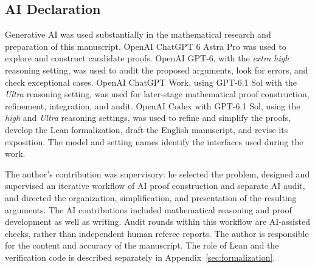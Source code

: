 \subsection*{AI Declaration}
Generative AI was used substantially in the mathematical research and
preparation of this manuscript. OpenAI ChatGPT 6 Astra Pro was used to
explore and construct candidate proofs. OpenAI GPT-6, with the
\emph{extra high} reasoning setting, was used to audit the proposed
arguments, look for errors, and check exceptional cases. OpenAI ChatGPT
Work, using GPT-6.1 Sol with the \emph{Ultra} reasoning setting, was
used for later-stage mathematical proof construction, refinement,
integration, and audit. OpenAI Codex
with GPT-6.1 Sol, using the \emph{high} and \emph{Ultra} reasoning
settings, was used to refine and simplify the proofs, develop the Lean
formalization, draft the English manuscript, and revise its exposition.
The model and setting names identify the interfaces used during the work.

The author's contribution was supervisory: he selected the problem,
designed and supervised an iterative workflow of AI proof construction
and separate AI audit, and directed the organization, simplification,
and presentation of the resulting arguments. The AI contributions
included mathematical reasoning and proof development as well as
writing. Audit rounds within this workflow are AI-assisted checks,
rather than independent human referee reports. The author is responsible
for the content and accuracy of the manuscript. The role of Lean and
the verification code is described separately in
Appendix~\ref{sec:formalization}.
